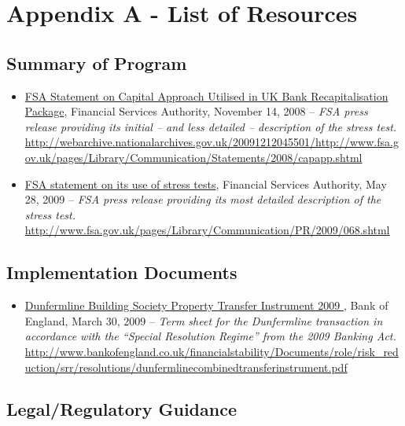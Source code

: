 \documentclass[12pt]{article}
\begin{document}
\newpage
{}


\nocite{*}


\newpage


\section{Appendix A - List of Resources}

\subsection{Summary of Program}

\begin{itemize}
\item
\ul{FSA Statement on Capital Approach Utilised in UK Bank Recapitalisation Package}, Financial Services Authority, November 14, 2008 -- \emph{FSA press release providing its initial -- and less detailed -- description of the stress test.} \url{http://webarchive.nationalarchives.gov.uk/20091212045501/http://www.fsa.gov.uk/pages/Library/Communication/Statements/2008/capapp.shtml}
\item
\ul{FSA statement on its use of stress tests}, Financial Services Authority, May 28, 2009 -- \emph{FSA press release providing its most detailed description of the stress test.} \url{http://www.fsa.gov.uk/pages/Library/Communication/PR/2009/068.shtml}
\end{itemize}

\subsection{Implementation Documents}
\begin{itemize}
\item
\ul{Dunfermline Building Society Property Transfer Instrument 2009 }, Bank of England, March 30, 2009 -- \emph{Term sheet for the Dunfermline transaction in accordance with the ``Special Resolution Regime'' from the 2009 Banking Act.} \url{http://www.bankofengland.co.uk/financialstability/Documents/role/risk_reduction/srr/resolutions/dunfermlinecombinedtransferinstrument.pdf}
\end{itemize}

\subsection{Legal/Regulatory Guidance}
\end{document}
